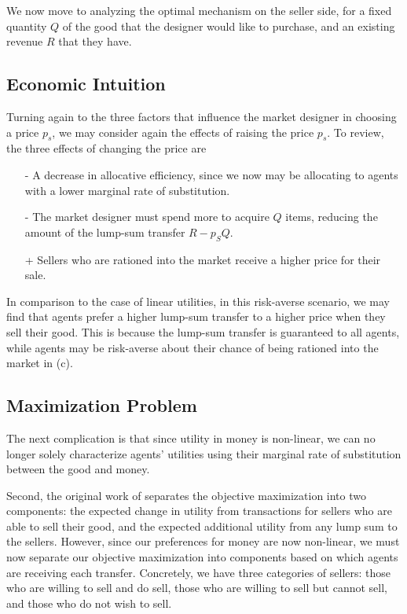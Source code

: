 \documentclass[AER]{AEA}
\begin{document}
We now move to analyzing the optimal mechanism on the seller side, for a fixed quantity $Q$ of the good that the designer would like to purchase, and an existing revenue $R$ that they have.

\subsection{Economic Intuition}

Turning again to the three factors that influence the market designer in choosing a price $p_s$, we may consider again the effects of raising the price $p_s$. To review, the three effects of changing the price are

\begin{enumerate}[(a)]
    \item [-] A decrease in allocative efficiency, since we now may be allocating to agents with a lower marginal rate of substitution. 
    \item [-] The market designer must spend more to acquire $Q$ items, reducing the amount of the lump-sum transfer $R - p_SQ$.
    \item [+] Sellers who are rationed into the market receive a higher price for their sale.
\end{enumerate}

In comparison to the case of linear utilities, in this risk-averse scenario, we may find that agents prefer a higher lump-sum transfer to a higher price when they sell their good. This is because the lump-sum transfer is guaranteed to all agents, while agents may be risk-averse about their chance of being rationed into the market in (c).


\subsection{Maximization Problem}

The next complication is that since utility in money is non-linear, we can no longer solely characterize agents' utilities using their marginal rate of substitution between the good and money.

Second, the original work of \cite{dworczak-2020} separates the objective maximization into two components: the expected change in utility from transactions for sellers who are able to sell their good, and the expected additional utility from any lump sum to the sellers. However, since our preferences for money are now non-linear, we must now separate our objective maximization into components based on which agents are receiving each transfer. Concretely, we have three categories of sellers: those who are willing to sell and do sell, those who are willing to sell but cannot sell, and those who do not wish to sell.
\end{document}
